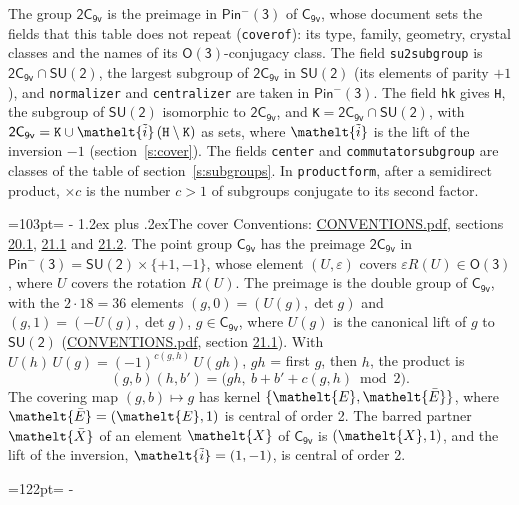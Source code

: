 \documentclass[10pt,a4paper]{article}
\makeatletter
\renewcommand\section{\@startsection{section}{1}{\z@}{-3ex plus -1ex minus -.2ex}%
  {1.2ex plus .2ex}{\normalfont\large\sffamily\bfseries\color{parttitle}}}
\newcommand{\needspace}[1]{\par\penalty-100\begingroup\dimen0=#1\relax\dimen2=\pagegoal
  \advance\dimen2-\pagetotal\ifdim\dimen0>\dimen2\relax\ifdim\dimen2>0pt\vfil\break\fi\fi
  \endgroup}
\numberwithin{equation}{section}
\newcommand{\eltfont}[1]{{\let\sigma\eltsigma\mathelt{#1}}}
\newcommand{\grp}[1]{\mathsf{#1}}
\newcommand{\elt}[1]{\eltfont{#1}}
\newcommand{\dirprod}{\times}
\newcommand{\barred}[1]{\bar{#1}}
\newcommand{\lift}[1]{\tilde{#1}}
\makeatother
\begin{document}
\leavevmode\label{n:element.inversion}\label{n:group.preimage}The group $\grp{2C_{9v}}$ is the preimage in $\grp{Pin^{-}(3)}$ of \href{../../../rotation/data/pdf/C9v.pdf}{$\grp{C_{9v}}$}, whose document sets the fields that this table does not repeat (\texttt{coverof}): its type, family, geometry, crystal classes and the names of its \href{../../../rotation/data/pdf/O3.pdf}{$\grp{O(3)}$}-conjugacy class. The field \texttt{su2subgroup} is $\grp{2C_{9v}} \cap \grp{SU(2)}$, the largest subgroup of $\grp{2C_{9v}}$ in $\grp{SU(2)}$ (its elements of parity $+1$), and \texttt{normalizer} and \texttt{centralizer} are taken in $\grp{Pin^{-}(3)}$. The field \texttt{hk} gives \texttt{H}, the subgroup of $\grp{SU(2)}$ isomorphic to $\grp{2C_{9v}}$, and \texttt{K}${} = \grp{2C_{9v}} \cap \grp{SU(2)}$, with $\grp{2C_{9v}} = \texttt{K} \cup \elt{\lift{i}}\,(\texttt{H} \setminus \texttt{K})$ as sets, where $\elt{\lift{i}}$ is the lift of the inversion $-1$ (section~\ref{s:cover}). The fields \texttt{center} and \texttt{commutatorsubgroup} are classes of the table of section~\ref{s:subgroups}.
\leavevmode\label{n:index.conjugates.c}In \texttt{productform}, after a semidirect product, ${\times}c$ is the number $c > 1$ of subgroups conjugate to its second factor.
\needspace{103pt}
\section{The cover}\label{s:cover}
Conventions: \href{../../CONVENTIONS.pdf}{CONVENTIONS.pdf}, sections \href{../../CONVENTIONS.pdf\#conv.20.1}{20.1}, \href{../../CONVENTIONS.pdf\#conv.21.1}{21.1} and \href{../../CONVENTIONS.pdf\#conv.21.2}{21.2}.
\leavevmode\label{n:group.pin.minus}\label{n:group.su2}\label{n:local.pin.sign}\label{n:matrix.covered}\label{n:matrix.lift.su2}\label{n:index.bar}The point group $\grp{C_{9v}}$ has the preimage $\grp{2C_{9v}}$ in $\grp{Pin^{-}(3)} = \grp{SU(2)} \dirprod \{+1, -1\}$, whose element $(U, \varepsilon)$ covers $\varepsilon R(U) \in \grp{O(3)}$, where $U$ covers the rotation $R(U)$. The preimage is the double group of $\grp{C_{9v}}$, with the $2 \cdot 18 = 36$ elements $(g, 0) = (U(g), \det g)$ and $(g, 1) = (-U(g), \det g)$, $g \in \grp{C_{9v}}$, where $U(g)$ is the canonical lift of $g$ to $\grp{SU(2)}$ (\href{../../CONVENTIONS.pdf}{CONVENTIONS.pdf}, section \href{../../CONVENTIONS.pdf\#conv.21.1}{21.1}). \label{n:function.cocycle}With $U(h)\,U(g) = (-1)^{c(g,h)}\,U(gh)$, $gh$ = first $g$, then $h$, the product is
\begin{equation}\label{e:product}(g, b)(h, b') = \bigl(gh,\ b + b' + c(g, h) \bmod 2\bigr).\end{equation}
\leavevmode\label{n:mark.bar}The covering map $(g, b) \mapsto g$ has kernel $\{\elt{E}, \elt{\barred{E}}\}$, where $\elt{\barred{E}} = (\elt{E}, 1)$ is central of order 2. \label{n:element.named}\label{n:mark.lift}The barred partner $\elt{\barred{X}}$ of an element $\elt{X}$ of $\grp{C_{9v}}$ is $(\elt{X}, 1)$, and the lift of the inversion, $\elt{\lift{i}} = (1, -1)$, is central of order 2.
\needspace{122pt}
\end{document}
